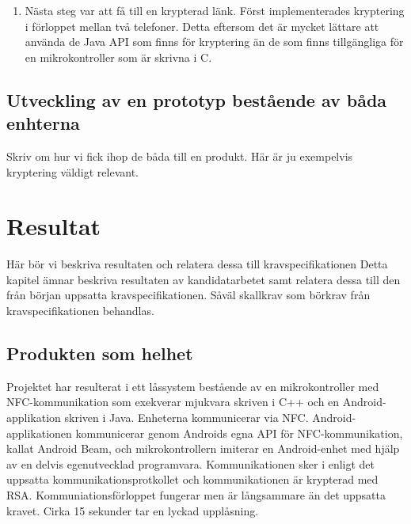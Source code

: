 \documentclass[11pt]{article}
\begin{document}
\begin{enumerate}
\item Nästa steg var att få till en krypterad länk. Först implementerades kryptering i förloppet mellan två telefoner. Detta eftersom det är mycket lättare att använda de Java API som finns för kryptering än de som finns tillgängliga för en mikrokontroller som är skrivna i C.
\end{enumerate}

\subsection{Utveckling av en prototyp bestående av båda enhterna}
Skriv om hur vi fick ihop de båda till en produkt. Här är ju exempelvis kryptering väldigt relevant.

\section{Resultat}
Här bör vi beskriva resultaten och relatera dessa till kravspecifikationen
Detta kapitel ämnar beskriva resultaten av kandidatarbetet samt relatera dessa till den från början uppsatta kravspecifikationen. Såväl skallkrav som börkrav från kravspecifikationen behandlas.

\subsection{Produkten som helhet}
Projektet har resulterat i ett låssystem bestående av en mikrokontroller med NFC-kommunikation som exekverar mjukvara skriven i C++ och en Android-applikation skriven i Java. Enheterna kommunicerar via NFC. Android-applikationen kommunicerar genom Androids egna API för NFC-kommunikation, kallat Android Beam, och mikrokontrollern imiterar en Android-enhet med hjälp av en delvis egenutvecklad programvara. Kommunikationen sker i enligt det uppsatta kommunikationsprotkollet och kommunikationen är krypterad med RSA. Kommuniationsförloppet fungerar men är långsammare än det uppsatta kravet. Cirka 15 sekunder tar en lyckad upplåsning. 
\end{document}
